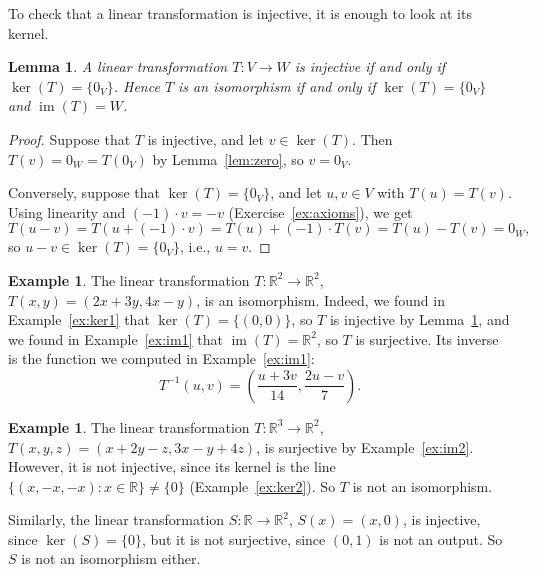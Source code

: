 \documentclass[11pt]{article}
\theoremstyle{definition}
\newtheorem{example}[definition]{Example}
\theoremstyle{plain}
\newtheorem{lemma}[definition]{Lemma}
\theoremstyle{remark}
\DeclareMathOperator{\im}{im}
\begin{document}
To check that a linear transformation is injective, it is enough to look at its kernel.

\begin{lemma}\label{lem:injective}
    A linear transformation $T: V \to W$ is injective if and only if $\ker(T) = \{0_V\}$. Hence $T$ is an isomorphism if and only if $\ker(T) = \{0_V\}$ and $\im(T) = W$.
\end{lemma}

\begin{proof}
    Suppose that $T$ is injective, and let $v \in \ker(T)$. Then $T(v) = 0_W = T(0_V)$ by Lemma~\ref{lem:zero}, so $v = 0_V$.

    Conversely, suppose that $\ker(T) = \{0_V\}$, and let $u, v \in V$ with $T(u) = T(v)$. Using linearity and $(-1) \cdot v = -v$ (Exercise~\ref{ex:axioms}), we get
    \[T(u - v) = T(u + (-1) \cdot v) = T(u) + (-1) \cdot T(v) = T(u) - T(v) = 0_W,\]
    so $u - v \in \ker(T) = \{0_V\}$, i.e., $u = v$.
\end{proof}

\begin{example}\label{ex:iso1}
    The linear transformation $T: \mathbb{R}^2 \to \mathbb{R}^2$, $T(x, y) = (2x + 3y, 4x - y)$, is an isomorphism. Indeed, we found in Example~\ref{ex:ker1} that $\ker(T) = \{(0, 0)\}$, so $T$ is injective by Lemma~\ref{lem:injective}, and we found in Example~\ref{ex:im1} that $\im(T) = \mathbb{R}^2$, so $T$ is surjective. Its inverse is the function we computed in Example~\ref{ex:im1}:
    \[T^{-1}(u, v) = \left(\frac{u + 3v}{14}, \frac{2u - v}{7}\right).\]
\end{example}

\begin{example}
    The linear transformation $T: \mathbb{R}^3 \to \mathbb{R}^2$, $T(x, y, z) = (x + 2y - z, 3x - y + 4z)$, is surjective by Example~\ref{ex:im2}. However, it is not injective, since its kernel is the line $\{(x, -x, -x) : x \in \mathbb{R}\} \neq \{0\}$ (Example~\ref{ex:ker2}). So $T$ is not an isomorphism.

    Similarly, the linear transformation $S: \mathbb{R} \to \mathbb{R}^2$, $S(x) = (x, 0)$, is injective, since $\ker(S) = \{0\}$, but it is not surjective, since $(0, 1)$ is not an output. So $S$ is not an isomorphism either.
\end{example}
\end{document}
